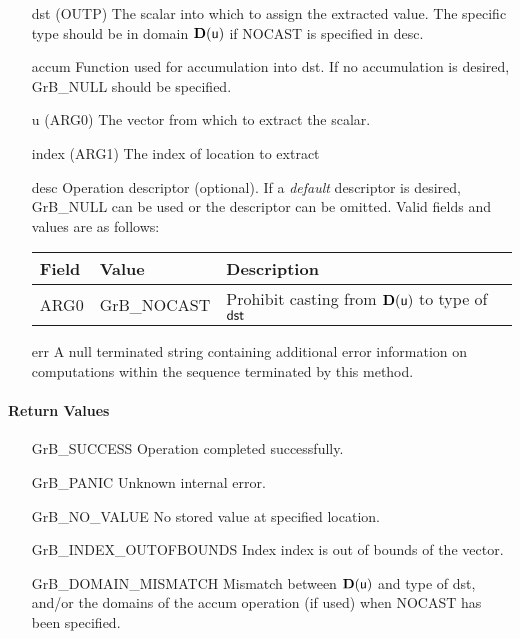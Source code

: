 \begin{itemize}[leftmargin=1in]
    \item[{\sf dst}]   ({\sf OUTP}) The scalar into which to assign the extracted value.  The specific type should be in domain $\bold{D}({\sf u})$ if {\sf NOCAST} is specified in {\sf desc}.
    \item[{\sf accum}] Function used for accumulation into dst. If no accumulation is desired,
                        {\sf GrB\_NULL} should be specified.
    \item[{\sf u}]   ({\sf ARG0}) The vector from which to extract the scalar.
    \item[{\sf index}]     ({\sf ARG1}) The index of location to extract

    \item[{\sf desc}]   Operation descriptor (optional). If a
    \emph{default} descriptor is desired, {\sf GrB\_NULL} can be
    used or the descriptor can be omitted.  Valid fields and values are as follows: \\
    \begin{tabular}{lll}
    Field  & Value & Description \\
    \hline
    {\sf ARG0} & {\sf GrB\_NOCAST} & Prohibit casting from $\bold{D}({\sf u})$ to type of ${\sf dst}$ \\
    \end{tabular}
    \item[{\sf err}]     A null terminated string containing additional error
                         information on computations within the sequence 
                         terminated by this method. 

\end{itemize}

\paragraph{Return Values}

\begin{itemize}[leftmargin=2.1in]
\item[{\sf GrB\_SUCCESS}]          Operation completed successfully.
\item[{\sf GrB\_PANIC}]            Unknown internal error.
\item[{\sf GrB\_NO\_VALUE}]        No stored value at specified location.
\item[{\sf GrB\_INDEX\_OUTOFBOUNDS}]  Index {\sf index} is out of 
                                      bounds of the vector. 
\item[{\sf GrB\_DOMAIN\_MISMATCH}]    Mismatch between $\bold{D}(\sf u)$ and type of {\sf dst},
                                      and/or the domains of the 
                                      {\sf accum} operation (if used) when {\sf NOCAST} has
                                      been specified.
\end{itemize}

